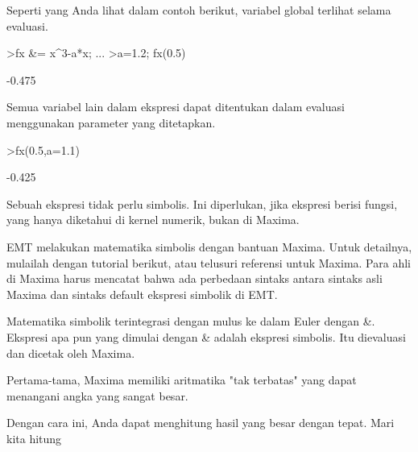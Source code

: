 \documentclass[a4paper,10pt]{article}
\begin{document}
\begin{eulernotebook}
\begin{eulercomment}
Seperti yang Anda lihat dalam contoh berikut, variabel global terlihat
selama evaluasi.
\end{eulercomment}
\begin{eulerprompt}
>fx &= x^3-a*x;  ...
>a=1.2; fx(0.5)
\end{eulerprompt}
\begin{euleroutput}
  -0.475
\end{euleroutput}
\begin{eulercomment}
Semua variabel lain dalam ekspresi dapat ditentukan dalam evaluasi
menggunakan parameter yang ditetapkan.
\end{eulercomment}
\begin{eulerprompt}
>fx(0.5,a=1.1)
\end{eulerprompt}
\begin{euleroutput}
  -0.425
\end{euleroutput}
\begin{eulercomment}
Sebuah ekspresi tidak perlu simbolis. Ini diperlukan, jika ekspresi
berisi fungsi, yang hanya diketahui di kernel numerik, bukan di
Maxima.

\begin{eulercomment}
\begin{eulercomment}
EMT melakukan matematika simbolis dengan bantuan Maxima. Untuk
detailnya, mulailah dengan tutorial berikut, atau telusuri referensi
untuk Maxima. Para ahli di Maxima harus mencatat bahwa ada perbedaan
sintaks antara sintaks asli Maxima dan sintaks default ekspresi
simbolik di EMT.

Matematika simbolik terintegrasi dengan mulus ke dalam Euler dengan \&.
Ekspresi apa pun yang dimulai dengan \& adalah ekspresi simbolis. Itu
dievaluasi dan dicetak oleh Maxima.

Pertama-tama, Maxima memiliki aritmatika "tak terbatas" yang dapat
menangani angka yang sangat besar.
\end{eulercomment}
\begin{eulercomment}
Dengan cara ini, Anda dapat menghitung hasil yang besar dengan tepat.
Mari kita hitung


\end{eulercomment}
\end{eulercomment}
\end{eulercomment}
\end{eulernotebook}
\end{document}
